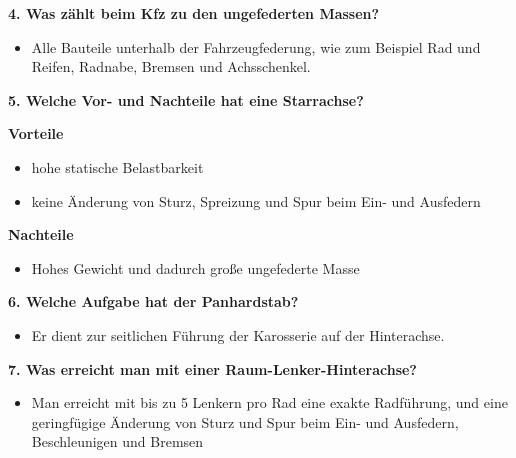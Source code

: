 \textbf{4. Was zählt beim Kfz zu den ungefederten Massen?}

\begin{itemize}
\item
  Alle Bauteile unterhalb der Fahrzeugfederung, wie zum Beispiel Rad und
  Reifen, Radnabe, Bremsen und Achsschenkel.
\end{itemize}

\textbf{5. Welche Vor- und Nachteile hat eine Starrachse?}

\textbf{Vorteile}

\begin{itemize}
\item
  hohe statische Belastbarkeit
\item
  keine Änderung von Sturz, Spreizung und Spur beim Ein- und Ausfedern
\end{itemize}

\textbf{Nachteile}

\begin{itemize}
\item
  Hohes Gewicht und dadurch große ungefederte Masse
\end{itemize}

\textbf{6. Welche Aufgabe hat der Panhardstab?}

\begin{itemize}
\item
  Er dient zur seitlichen Führung der Karosserie auf der Hinterachse.
\end{itemize}

\textbf{7. Was erreicht man mit einer Raum-Lenker-Hinterachse?}

\begin{itemize}
\item
  Man erreicht mit bis zu 5 Lenkern pro Rad eine exakte Radführung, und
  eine geringfügige Änderung von Sturz und Spur beim Ein- und Ausfedern,
  Beschleunigen und Bremsen
\end{itemize}
